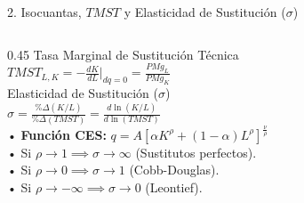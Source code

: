 \documentclass[aspectratio=169, 10pt]{beamer}
\begin{document}
\begin{frame}{2. Isocuantas, \(TMST\) y Elasticidad de Sustitución (\(\sigma\))}
\begin{columns}[T]
    \begin{column}{0.45\textwidth}
      {\scriptsize\color{grisTexto}Tasa Marginal de Sustitución Técnica}\\[1pt]
      {\large\color{azulPrincipal}\textbf{\(TMST_{L,K} = -\frac{dK}{dL}\Big|_{dq=0} = \frac{PMg_L}{PMg_K}\)}}\\[6pt]
      {\scriptsize\color{grisTexto}Elasticidad de Sustitución (\(\sigma\))}\\[1pt]
      {\large\color{rojoAcento}\textbf{\(\sigma = \frac{\%\Delta(K/L)}{\%\Delta(TMST)} = \frac{d\ln(K/L)}{d\ln(TMST)}\)}}\\[6pt]
      {\scriptsize
        • \textbf{Función CES:} \(q = A\left[\alpha K^\rho + (1-\alpha)L^\rho\right]^{\frac{\nu}{\rho}}\)\\
        • Si \(\rho \to 1 \implies \sigma \to \infty\) (Sustitutos perfectos).\\
        • Si \(\rho \to 0 \implies \sigma \to 1\) (Cobb-Douglas).\\
        • Si \(\rho \to -\infty \implies \sigma \to 0\) (Leontief).
      }
    \end{column}
  \end{columns}

\end{frame}
\end{document}
